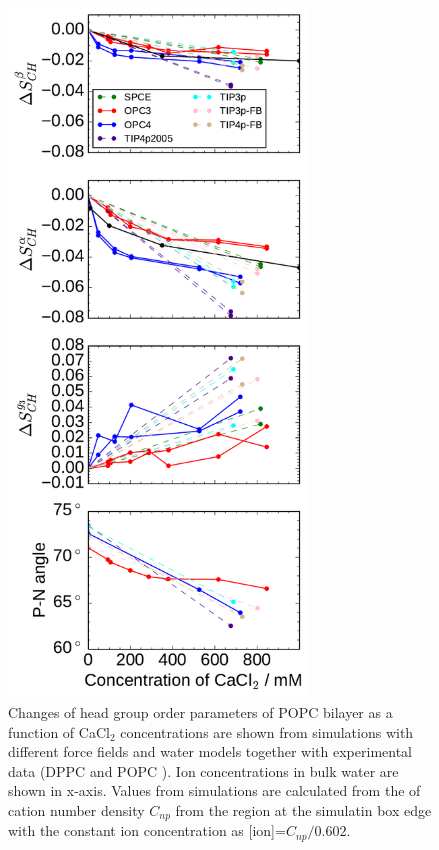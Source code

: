 \documentclass[aip,jcp,twocolumn]{revtex4}
\begin{document}
\begin{figure}[tbp]
  \centering
  \includegraphics[width=8.0cm]{../Fig/ipython_nb/PN_angle_OrdPars-A-B-g3_L14-ECCL17_q80_sig89_CaCl_waterModels.pdf}
  \caption{\label{fig:ordPars_waterModels}
    Changes of head group order parameters of POPC bilayer as a function of CaCl$_2$ concentrations
    are shown from simulations with different force fields and water models together with experimental data 
    (DPPC \cite{akutsu81} and POPC \cite{altenbach84}). 
    Ion concentrations in bulk water are shown in x-axis. 
    Values from simulations are calculated from the of cation number density $C_{np}$
    from the region at the simulatin box edge with the constant ion concentration as [ion]=$C_{np}/0.602$.
  }
\end{figure}





\listoftodos
\end{document}
